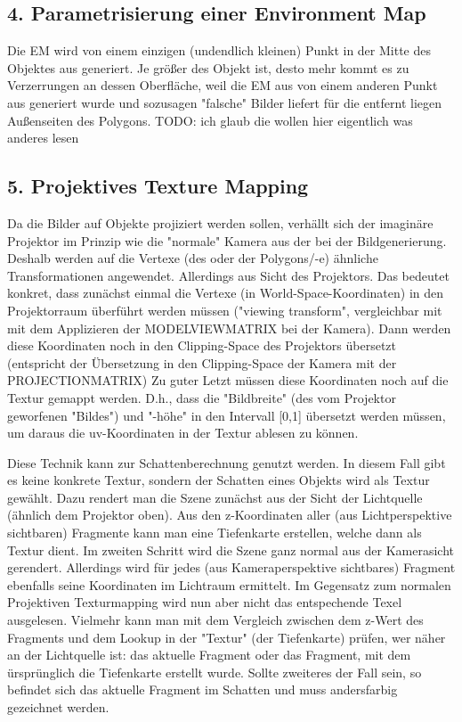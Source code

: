 \documentclass[a4paper,headings=small]{scrartcl}
\numberwithin{equation}{section} %
\numberwithin{figure}{section}   %
\begin{document}
\subsection*{4. Parametrisierung einer Environment Map}
Die EM wird von einem einzigen (undendlich kleinen) Punkt in der Mitte des Objektes aus generiert.
Je größer des Objekt ist, desto mehr kommt es zu Verzerrungen an dessen Oberfläche, weil die EM aus von einem anderen Punkt aus generiert wurde und sozusagen "falsche" Bilder liefert für die entfernt liegen Außenseiten des Polygons.
TODO: ich glaub die wollen hier eigentlich was anderes lesen

\subsection*{5. Projektives Texture Mapping}
Da die Bilder auf Objekte projiziert werden sollen, verhällt sich der imaginäre Projektor im Prinzip wie die "normale" Kamera aus der bei der Bildgenerierung.
Deshalb werden auf die Vertexe (des oder der Polygons/-e) ähnliche Transformationen angewendet.
Allerdings aus Sicht des Projektors.
Das bedeutet konkret, dass zunächst einmal die Vertexe (in World-Space-Koordinaten) in den Projektorraum überführt werden müssen ("viewing transform", vergleichbar mit mit dem Applizieren der MODELVIEWMATRIX bei der Kamera).
Dann werden diese Koordinaten noch in den Clipping-Space des Projektors übersetzt (entspricht der Übersetzung in den Clipping-Space der Kamera mit der PROJECTIONMATRIX)
Zu guter Letzt müssen diese Koordinaten noch auf die Textur gemappt werden.
D.h., dass die "Bildbreite" (des vom Projektor geworfenen "Bildes") und "-höhe" in den Intervall [0,1] übersetzt werden müssen, um daraus die uv-Koordinaten in der Textur ablesen zu können.

Diese Technik kann zur Schattenberechnung genutzt werden. In diesem Fall gibt es keine konkrete Textur, sondern der Schatten eines Objekts wird als Textur gewählt.
Dazu rendert man die Szene zunächst aus der Sicht der Lichtquelle (ähnlich dem Projektor oben).
Aus den z-Koordinaten aller (aus Lichtperspektive sichtbaren) Fragmente kann man eine Tiefenkarte erstellen, welche dann als Textur dient.
Im zweiten Schritt wird die Szene ganz normal aus der Kamerasicht gerendert.
Allerdings wird für jedes (aus Kameraperspektive sichtbares) Fragment ebenfalls seine Koordinaten im Lichtraum ermittelt.
Im Gegensatz zum normalen Projektiven Texturmapping wird nun aber nicht das entspechende Texel ausgelesen.
Vielmehr kann man mit dem Vergleich zwischen dem z-Wert des Fragments und dem Lookup in der "Textur" (der Tiefenkarte) prüfen, wer näher an der Lichtquelle ist: das aktuelle Fragment oder das Fragment, mit dem ürsprünglich die Tiefenkarte erstellt wurde. Sollte zweiteres der Fall sein, so befindet sich das aktuelle Fragment im Schatten und muss andersfarbig gezeichnet werden.
\end{document}
